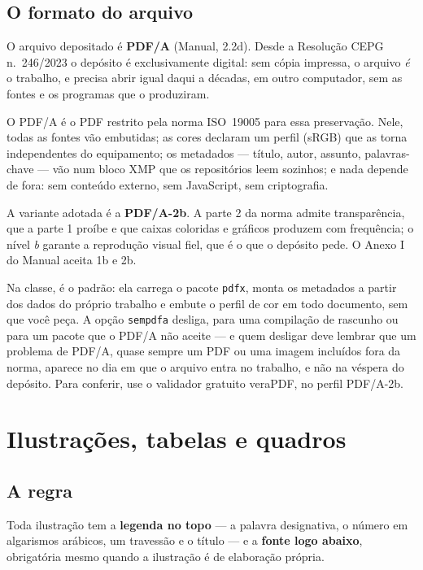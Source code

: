 \documentclass[dsc]{ufrj}
\begin{document}
  \section{O formato do arquivo}

  O arquivo depositado é \textbf{PDF/A} (Manual, 2.2d). Desde a Resolução CEPG
  n.~246/2023 o depósito é exclusivamente digital: sem cópia impressa, o arquivo
  \emph{é} o trabalho, e precisa abrir igual daqui a décadas, em outro
  computador, sem as fontes e os programas que o produziram.

  O PDF/A é o PDF restrito pela norma ISO~19005 para essa preservação. Nele,
  todas as fontes vão embutidas; as cores declaram um perfil (sRGB) que as torna
  independentes do equipamento; os metadados --- título, autor, assunto,
  palavras-chave --- vão num bloco XMP que os repositórios leem sozinhos; e nada
  depende de fora: sem conteúdo externo, sem JavaScript, sem criptografia.

  A variante adotada é a \textbf{PDF/A-2b}. A parte 2 da norma admite
  transparência, que a parte 1 proíbe e que caixas coloridas e gráficos
  produzem com frequência; o nível \emph{b} garante a reprodução visual fiel,
  que é o que o depósito pede. O Anexo I do Manual aceita 1b e 2b.

  Na classe, é o padrão: ela carrega o pacote \verb|pdfx|, monta os metadados a
  partir dos dados do próprio trabalho e embute o perfil de cor em todo
  documento, sem que você peça. A opção \verb|sempdfa| desliga, para uma
  compilação de rascunho ou para um pacote que o PDF/A não aceite --- e quem
  desligar deve lembrar que um problema de PDF/A, quase sempre um PDF ou uma
  imagem incluídos fora da norma, aparece no dia em que o arquivo entra no
  trabalho, e não na véspera do depósito. Para conferir, use o validador
  gratuito veraPDF, no perfil PDF/A-2b.

  \chapter{Ilustrações, tabelas e quadros}

  \section{A regra}

  Toda ilustração tem a \textbf{legenda no topo} --- a palavra designativa, o
  número em algarismos arábicos, um travessão e o título --- e a \textbf{fonte
  logo abaixo}, obrigatória mesmo quando a ilustração é de elaboração própria.
\end{document}
